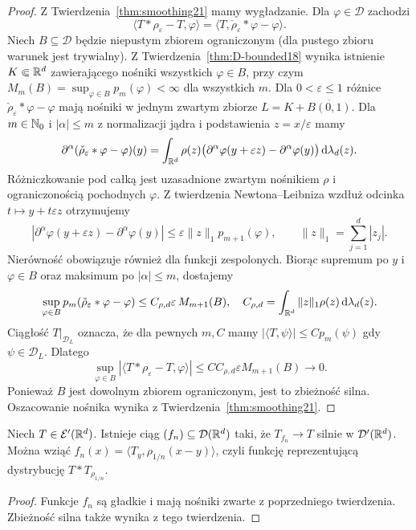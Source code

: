 \begin{proof}
Z Twierdzenia~\ref{thm:smoothing21} mamy wygładzanie.
Dla $\varphi\in\mathcal D$ zachodzi
\[
 \langle T*\rho_\varepsilon-T,\varphi\rangle
 =\langle T,\check\rho_\varepsilon*\varphi-\varphi\rangle.
\]
Niech $B\subseteq\mathcal D$ będzie niepustym zbiorem
ograniczonym (dla pustego zbioru warunek jest trywialny).
Z Twierdzenia~\ref{thm:D-bounded18}
wynika istnienie $K\Subset\mathbb R^d$ zawierającego nośniki
wszystkich $\varphi\in B$, przy czym
$M_m(B)=\sup_{\varphi\in B}p_m(\varphi)<\infty$
dla wszystkich $m$. Dla $0<\varepsilon\le1$
różnice $\check\rho_\varepsilon*\varphi-\varphi$
mają nośniki w jednym zwartym zbiorze
$L=K+\overline{B(0,1)}$. Dla $m\in\mathbb N_0$ i $|\alpha|\le m$ z normalizacji jądra
i podstawienia $z=x/\varepsilon$ mamy
\[
\begin{aligned}
 \partial^\alpha(\check\rho_\varepsilon*\varphi-\varphi)(y)
 =\int_{\mathbb R^d}\rho(z)
 \bigl(\partial^\alpha\varphi(y+\varepsilon z)
 -\partial^\alpha\varphi(y)\bigr)\,\mathrm d\lambda_d(z).
\end{aligned}
\]
Różniczkowanie pod całką jest uzasadnione zwartym
nośnikiem $\rho$ i ograniczonością pochodnych $\varphi$.
Z twierdzenia Newtona--Leibniza wzdłuż odcinka
$t\mapsto y+t\varepsilon z$ otrzymujemy
\[
 |\partial^\alpha\varphi(y+\varepsilon z)
 -\partial^\alpha\varphi(y)|
 \le\varepsilon\|z\|_1 p_{m+1}(\varphi),
 \qquad \|z\|_1=\sum_{j=1}^d|z_j|.
\]
Nierówność obowiązuje również dla funkcji zespolonych.
Biorąc supremum po $y$ i $\varphi\in B$ oraz maksimum
po $|\alpha|\le m$, dostajemy
\[
 \sup_{\varphi\in B}p_m(\check\rho_\varepsilon*\varphi
 -\varphi)
 \le C_{\rho,d}\varepsilon\,M_{m+1}(B),
 \quad
 C_{\rho,d}=\int_{\mathbb R^d}\|z\|_1\rho(z)\,\mathrm d\lambda_d(z).
\]
Ciągłość $T|_{\mathcal D_L}$ oznacza, że dla pewnych
$m,C$ mamy $|\langle T,\psi\rangle|\le Cp_m(\psi)$
gdy $\psi\in\mathcal D_L$. Dlatego
\[
 \sup_{\varphi\in B}|\langle T*\rho_\varepsilon-T,
 \varphi\rangle|
 \le CC_{\rho,d}\varepsilon M_{m+1}(B)\longrightarrow0.
\]
Ponieważ $B$ jest dowolnym zbiorem ograniczonym,
jest to zbieżność silna. Oszacowanie nośnika wynika
z Twierdzenia~\ref{thm:smoothing21}.
\end{proof}

\begin{wniosek}
\label{cor:dense-test-compact21}
Niech $T\in\mathcal E'(\mathbb R^d)$. Istnieje ciąg
$(f_n)\subseteq\mathcal D(\mathbb R^d)$ taki, że
$T_{f_n}\to T$ silnie w $\mathcal D'(\mathbb R^d)$.
Można wziąć $f_n(x)=\langle T_y,\rho_{1/n}(x-y)\rangle$,
czyli funkcję reprezentującą dystrybucję $T*T_{\rho_{1/n}}$.
\end{wniosek}
\begin{proof}
Funkcje $f_n$ są gładkie i mają nośniki zwarte
z poprzedniego twierdzenia. Zbieżność silna także
wynika z tego twierdzenia.
\end{proof}

